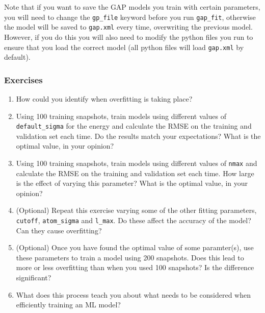 \documentclass{article}
\begin{document}
Note that if you want to save the GAP models you train with certain parameters, you will need to change the \verb|gp_file| keyword before you run \verb|gap_fit|, otherwise the model will be saved to \verb|gap.xml| every time, overwriting the previous model. However, if you do this you will also need to modify the python files you run to ensure that you load the correct model (all python files will load \verb|gap.xml| by default).

\subsubsection*{Exercises}

\begin{enumerate}
\item How could you identify when overfitting is taking place?
\item Using 100 training snapshots, train models using different values of \verb|default_sigma| for the energy and calculate the RMSE on the training and validation set each time. Do the results match your expectations? What is the optimal value, in your opinion?
\item Using 100 training snapshots, train models using different values of \verb|nmax| and calculate the RMSE on the training and validation set each time. How large is the effect of varying this parameter? What is the optimal value, in your opinion?
\item (Optional) Repeat this exercise varying some of the other fitting parameters, \verb|cutoff|, \verb|atom_sigma| and \verb|l_max|. Do these affect the accuracy of the model? Can they cause overfitting?
\item (Optional) Once you have found the optimal value of some paramter(s), use these parameters to train a model using 200 snapshots. Does this lead to more or less overfitting than when you used 100 snapshots? Is the difference significant?
\item What does this process teach you about what needs to be considered when efficiently training an ML model?

\end{enumerate}


\end{document}
